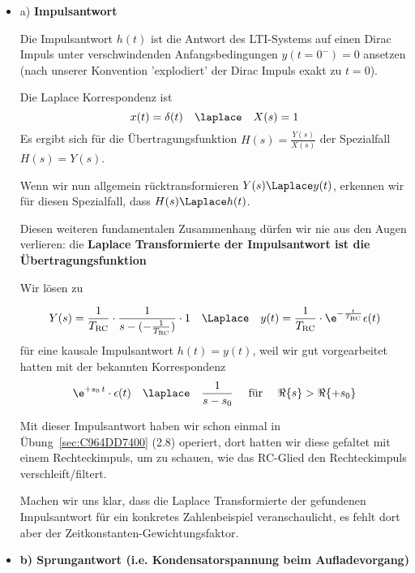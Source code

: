 \begin{Loesung}


\begin{itemize}
  \item a) \textbf{Impulsantwort}

  Die Impulsantwort $h(t)$ ist die Antwort des LTI-Systems auf einen Dirac Impuls unter
  verschwindenden Anfangsbedingungen $y(t=0^-)=0$ ansetzen (nach
  unserer Konvention 'explodiert' der Dirac Impuls exakt zu $t=0$).

  Die Laplace Korrespondenz ist
  \begin{equation}
  x(t)=\delta(t) \quad\laplace\quad X(s) = 1
  \end{equation}
  Es ergibt sich für die Übertragungsfunktion $H(s)=\frac{Y(s)}{X(s)}$
  der Spezialfall $H(s)=Y(s)$.

  Wenn wir nun allgemein rücktransformieren $Y(s) \Laplace y(t)$, erkennen wir
  für diesen Spezialfall, dass $H(s) \Laplace h(t)$.

  Diesen weiteren fundamentalen Zusammenhang dürfen wir nie aus den Augen verlieren:
  die \textbf{Laplace Transformierte der Impulsantwort ist die Übertragungsfunktion}

  Wir lösen zu

  \begin{align}
  Y(s) = \frac{1}{T_\mathrm{RC}}\cdot\frac{1}{s - (-\frac{1}{T_\mathrm{RC}})} \cdot 1
  \quad\Laplace\quad
  y(t) = \frac{1}{T_\mathrm{RC}} \cdot \e^{-\frac{t}{T_\mathrm{RC}}} \epsilon(t)
  \end{align}
  für eine kausale Impulsantwort $h(t)=y(t)$, weil wir gut vorgearbeitet hatten
  mit der bekannten Korrespondenz
  \begin{align}
  \e^{+s_0 \, t} \cdot \epsilon(t) \quad \laplace \quad \frac{1}{s-s_0} \quad\text{ für } \quad\Re\{s\} > \Re\{+s_0\}
  \end{align}

  Mit dieser Impulsantwort haben wir schon einmal in Übung~\ref{sec:C964DD7400} (2.8) operiert, dort
  hatten wir diese gefaltet mit einem Rechteckimpuls, um zu schauen, wie das RC-Glied
  den Rechteckimpuls verschleift/filtert.

  Machen wir uns klar, dass 
  die Laplace Transformierte der gefundenen Impulsantwort für ein konkretes
  Zahlenbeispiel veranschaulicht, es fehlt dort aber der Zeitkonstanten-Gewichtungsfaktor.

  \item \textbf{b) Sprungantwort (i.e. Kondensatorspannung beim Aufladevorgang)}


\end{itemize}
\end{Loesung}
